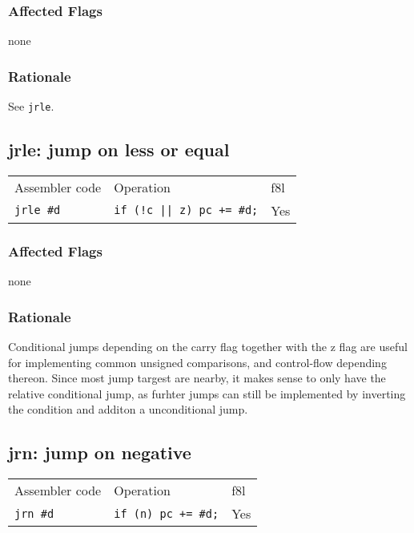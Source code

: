 \documentclass{book}
\begin{document}
\subsubsection*{Affected Flags}

none

\subsubsection*{Rationale}

See \texttt{jrle}.


\subsection{jrle: jump on less or equal}

\begin{tabular}{l l l}
Assembler code    & Operation                        & f8l \\
\texttt{jrle \#d} & \texttt{if (!c || z) pc += \#d;} & Yes \\
\end{tabular}

\subsubsection*{Affected Flags}

none

\subsubsection*{Rationale}

Conditional jumps depending on the carry flag together with the z flag are useful for implementing common unsigned comparisons, and control-flow depending thereon. Since most jump targest are nearby, it makes sense to only have the relative conditional jump, as furhter jumps can still be implemented by inverting the condition and additon a unconditional jump.


\subsection{jrn: jump on negative}

\begin{tabular}{l l l}
Assembler code   & Operation                  & f8l \\
\texttt{jrn \#d} & \texttt{if (n) pc += \#d;} & Yes \\
\end{tabular}
\end{document}

